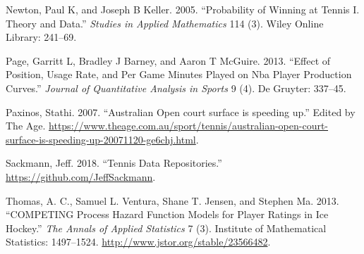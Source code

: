 \documentclass[]{article}
\begin{document}
\hypertarget{ref-newton2005}{}
Newton, Paul K, and Joseph B Keller. 2005. ``Probability of Winning at
Tennis I. Theory and Data.'' \emph{Studies in Applied Mathematics} 114
(3). Wiley Online Library: 241--69.

\hypertarget{ref-page2013}{}
Page, Garritt L, Bradley J Barney, and Aaron T McGuire. 2013. ``Effect
of Position, Usage Rate, and Per Game Minutes Played on Nba Player
Production Curves.'' \emph{Journal of Quantitative Analysis in Sports} 9
(4). De Gruyter: 337--45.

\hypertarget{ref-theage2007}{}
Paxinos, Stathi. 2007. ``Australian Open court surface is speeding up.''
Edited by The Age.
\url{https://www.theage.com.au/sport/tennis/australian-open-court-surface-is-speeding-up-20071120-ge6chj.html}.

\hypertarget{ref-sackmann2018}{}
Sackmann, Jeff. 2018. ``Tennis Data Repositories.''
\url{https://github.com/JeffSackmann}.

\hypertarget{ref-thomas2013}{}
Thomas, A. C., Samuel L. Ventura, Shane T. Jensen, and Stephen Ma. 2013.
``COMPETING Process Hazard Function Models for Player Ratings in Ice
Hockey.'' \emph{The Annals of Applied Statistics} 7 (3). Institute of
Mathematical Statistics: 1497--1524.
\url{http://www.jstor.org/stable/23566482}.
\end{document}
